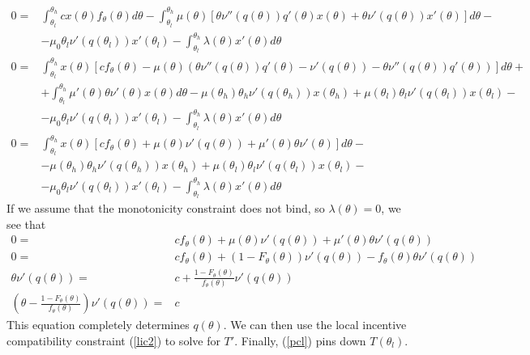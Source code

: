 \begin{align*}
  0 = & \int_{\theta_l}^{\theta_h} c x(\theta) f_\theta(\theta)
  d\theta - \int_{\theta_l}^{\theta_h} \mu(\theta)
  \left[ \theta \nu''(q(\theta))q'(\theta) x(\theta) + \theta
    \nu'(q(\theta)) x'(\theta) \right]d\theta - \\
  & - \mu_0 \theta_l
  \nu'(q(\theta_l))x'(\theta_l) - \int_{\theta_l}^{\theta_h}
  \lambda(\theta) x'(\theta) d\theta \\
  0 = & \int_{\theta_l}^{\theta_h} x(\theta)\left[ c f_\theta(\theta)
    - \mu(\theta) \left( \theta \nu''(q(\theta))q'(\theta) -
      \nu'(q(\theta)) - \theta \nu''(q(\theta))q'(\theta) \right) \right]
  d\theta + \\
  & + \int_{\theta_l}^{\theta_h} 
  \mu'(\theta) \theta \nu'(\theta) x(\theta) d\theta 
  - \mu(\theta_h)\theta_h \nu'(q(\theta_h))x(\theta_h) +
  \mu(\theta_l)\theta_l \nu'(q(\theta_l))x(\theta_l) - \\
  & - \mu_0 \theta_l \nu'(q(\theta_l))x'(\theta_l) 
  - \int_{\theta_l}^{\theta_h} \lambda(\theta) x'(\theta) d\theta \\
  0 = & \int_{\theta_l}^{\theta_h} x(\theta)\left[ c f_\theta(\theta)
    + \mu(\theta) \nu'(q(\theta)) + 
    \mu'(\theta) \theta \nu'(\theta)\right] d\theta  - \\
    & - \mu(\theta_h)\theta_h \nu'(q(\theta_h))x(\theta_h) +
    \mu(\theta_l)\theta_l \nu'(q(\theta_l))x(\theta_l) - \\
    & - \mu_0 \theta_l \nu'(q(\theta_l))x'(\theta_l) 
    - \int_{\theta_l}^{\theta_h} \lambda(\theta) x'(\theta) d\theta 
\end{align*}
If we assume that the monotonicity constraint does not bind, so
$\lambda(\theta) = 0$, we see that
\begin{align*}
  0 = &c f_\theta(\theta) + \mu(\theta) \nu'(q(\theta)) + \mu'(\theta)
   \theta \nu'(q(\theta))  \\
   0 = & cf_\theta(\theta) + (1-F_\theta(\theta)) \nu'(q(\theta)) -
   f_{\theta}(\theta) \theta \nu'(q(\theta)) \\
   \theta \nu'(q(\theta)) = & c +
   \frac{1-F_\theta(\theta)}{f_\theta(\theta)} \nu'(q(\theta)) \\
   \left(\theta - \frac{1-F_\theta(\theta)}{f_\theta(\theta)}
   \right)\nu'(q(\theta)) = & c 
 \end{align*}
This equation completely determines $q(\theta)$. We can then use the
local incentive compatibility constraint (\ref{lic2}) to solve for
$T'$. Finally, (\ref{pcl}) pins down $T(\theta_l)$.

